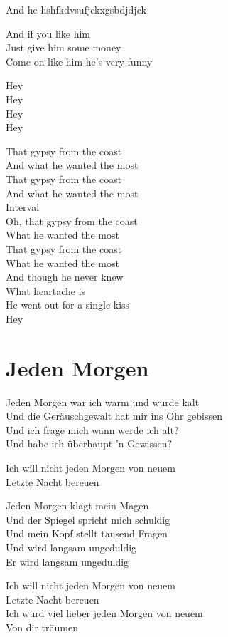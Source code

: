 \documentclass[]{book}
\begin{document}
And he hshfkdvsufjckxgsbdjdjck

And if you like him\\
Just give him some money\\
Come on like him he's very funny

Hey\\
Hey\\
Hey\\
Hey

That gypsy from the coast\\
And what he wanted the most\\
That gypsy from the coast\\
And what he wanted the most\\
Interval\\
Oh, that gypsy from the coast\\
What he wanted the most\\
That gypsy from the coast\\
What he wanted the most\\
And though he never knew\\
What heartache is\\
He went out for a single kiss\\
Hey

\hypertarget{jeden-morgen}{%
\section{Jeden Morgen}\label{jeden-morgen}}

Jeden Morgen war ich warm und wurde kalt\\
Und die Geräuschgewalt hat mir ins Ohr gebissen\\
Und ich frage mich wann werde ich alt?\\
Und habe ich überhaupt 'n Gewissen?

Ich will nicht jeden Morgen von neuem\\
Letzte Nacht bereuen

Jeden Morgen klagt mein Magen\\
Und der Spiegel spricht mich schuldig\\
Und mein Kopf stellt tausend Fragen\\
Und wird langsam ungeduldig\\
Er wird langsam ungeduldig

Ich will nicht jeden Morgen von neuem\\
Letzte Nacht bereuen\\
Ich würd viel lieber jeden Morgen von neuem\\
Von dir träumen
\end{document}
